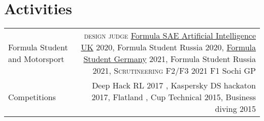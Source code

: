 \section*{\sectionformat Activities}
\begin{tabular}{@{}L!{\VRule}R}
    Formula Student and Motorsport &
    {\textsc{design judge}} \href{https://www.imeche.org/events/formula-student/team-information/fs-ai}{Formula SAE Artificial Intelligence UK} 2020, Formula Student Russia 2020, \href{https://www.formulastudent.de/fsg/}{Formula Student Germany} 2021, Formula Student Russia 2021,
    {\textsc{Scrutineering F2/F3}} 2021 F1 Sochi GP
    \\
    Competitions                   &
    Deep Hack RL 2017 ,
    Kaspersky DS hackaton 2017,
    Flatland ,
    Cup Technical 2015,
    Business diving 2015
\end{tabular}